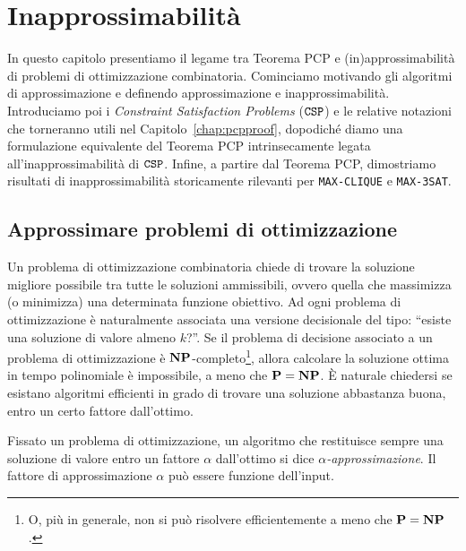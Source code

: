 \chapter{Inapprossimabilità} \label{chap:inapprox}

In questo capitolo presentiamo il legame tra Teorema PCP e
(in)approssimabilità di problemi di ottimizzazione combinatoria.
Cominciamo motivando gli algoritmi di approssimazione e definendo
approssimazione e inapprossimabilità.
Introduciamo poi i \emph{Constraint Satisfaction Problems} ($\mathtt{CSP}$) e le
relative notazioni che torneranno utili nel Capitolo~\ref{chap:pcpproof},
dopodiché diamo una formulazione equivalente del Teorema PCP intrinsecamente
legata all'inapprossimabilità di $\mathtt{CSP}$.
Infine, a partire dal Teorema PCP, dimostriamo risultati di
inapprossimabilità storicamente rilevanti per \texttt{MAX-CLIQUE} e
\texttt{MAX-3SAT}.

\section{Approssimare problemi di ottimizzazione}

Un problema di ottimizzazione combinatoria chiede di trovare la soluzione
migliore possibile tra tutte le soluzioni ammissibili, ovvero quella che
massimizza (o minimizza) una determinata funzione obiettivo.
Ad ogni problema di ottimizzazione è naturalmente associata una versione
decisionale del tipo: ``esiste una soluzione di valore almeno $k$?''.
Se il problema di decisione associato a un problema di ottimizzazione
è $\mathbf{NP}$-completo\footnote{O, più in generale, non si può risolvere
efficientemente a meno che $\mathbf{P} = \mathbf{NP}$.}, allora calcolare la soluzione ottima
in tempo polinomiale è impossibile, a meno che $\mathbf{P} = \mathbf{NP}$.
È naturale chiedersi se esistano algoritmi efficienti in grado di
trovare una soluzione abbastanza buona, entro un certo fattore dall'ottimo.

\begin{definition}
	Fissato un problema di ottimizzazione, un algoritmo che restituisce sempre
	una soluzione di valore entro un fattore $\alpha$ dall'ottimo si dice
	\emph{$\alpha$-approssimazione}.
	Il fattore di approssimazione $\alpha$ può essere funzione dell'input.
\end{definition}

